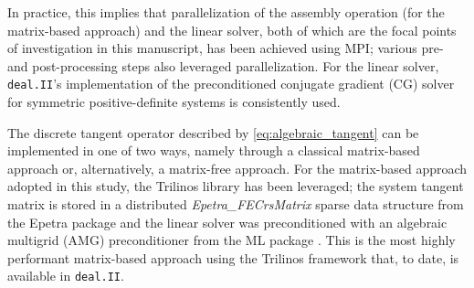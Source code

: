 \documentclass[AMA,STIX1COL]{WileyNJD-v2}
\begin{document}
In practice, this implies that parallelization of the assembly operation (for the matrix-based approach) and the linear solver,
both of which are the focal points of investigation in this manuscript, has been achieved using MPI;
various pre- and post-processing steps also leveraged parallelization.
For the linear solver, \texttt{deal.II}'s implementation of the preconditioned conjugate gradient (CG) solver for symmetric positive-definite systems is consistently used.

The discrete tangent operator described by \eqref{eq:algebraic_tangent} can be implemented in one of two ways,
namely through a classical matrix-based approach or, alternatively, a matrix-free approach.
For the matrix-based approach adopted in this study, the Trilinos \cite{Heroux2005} library has been leveraged;
the system tangent matrix is stored in a distributed \textit{Epetra\_FECrsMatrix} sparse data structure from the Epetra package \cite{Heroux2005b} and
the linear solver was preconditioned with an algebraic multigrid (AMG) preconditioner from the ML package \cite{Gee2006a}.
This is the most highly performant matrix-based approach using the Trilinos framework that, to date, is available in \texttt{deal.II}.
\end{document}
